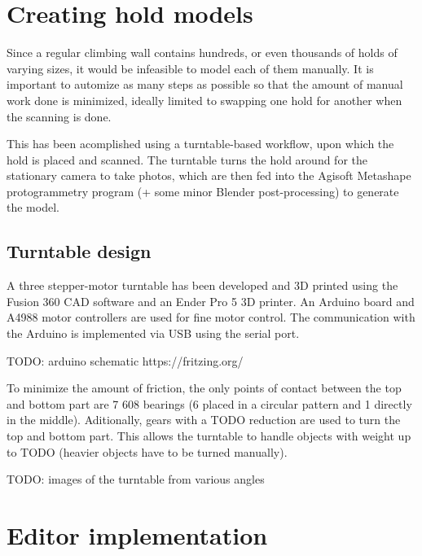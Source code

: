 \section{Creating hold models}
Since a regular climbing wall contains hundreds, or even thousands of holds of varying sizes, it would be infeasible to model each of them manually.
It is important to automize as many steps as possible so that the amount of manual work done is minimized, ideally limited to swapping one hold for another when the scanning is done.

This has been acomplished using a turntable-based workflow, upon which the hold is placed and scanned.
The turntable turns the hold around for the stationary camera to take photos, which are then fed into the Agisoft Metashape protogrammetry program (+ some minor Blender post-processing) to generate the model.

\subsection{Turntable design}
A three stepper-motor turntable has been developed and 3D printed using the Fusion 360 CAD software and an Ender Pro 5 3D printer.
An Arduino board and A4988 motor controllers are used for fine motor control.
The communication with the Arduino is implemented via USB using the serial port.

TODO: arduino schematic https://fritzing.org/

To minimize the amount of friction, the only points of contact between the top and bottom part are 7 608 bearings (6 placed in a circular pattern and 1 directly in the middle).
Aditionally, gears with a TODO reduction are used to turn the top and bottom part.
This allows the turntable to handle objects with weight up to TODO (heavier objects have to be turned manually).

TODO: images of the turntable from various angles

\section{Editor implementation}

